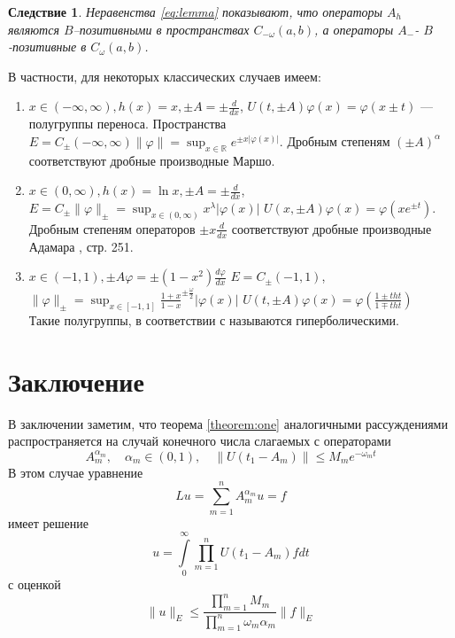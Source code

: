 \documentclass{cmfnre}
\theoremstyle{plain}
\newtheorem{corollary}{Следствие}[lemma]
\numberwithin{equation}{section}
\begin{document}
\begin{corollary}
        Неравенства \eqref{eq:lemma} показывают, что операторы $A_h$ являются $B$--позитивными
        в пространствах $C_{-\omega}(a, b)$, а операторы $A_{-}$- $B$-позитивные в $C_{\omega}(a, b)$.
\end{corollary}

В частности, для некоторых классических случаев имеем:
\begin{enumerate}
    \item $x \in (-\infty, \infty), h(x) = x, \pm A = \pm\frac{d}{dx}$,
    $U(t, \pm A)\varphi(x) = \varphi(x \pm t)$ --- полугруппы переноса.
    Пространства
    $E = C_{\pm}(-\infty, \infty) \|\varphi\| = \sup_{x \in \mathbb{R}} e^{\pm x |\varphi (x)|}$.
    Дробным степеням $(\pm A)^{\alpha}$ соответствуют дробные производные Маршо.
    \item $x \in (0, \infty), h(x) = \ln{x}, \pm A = \pm\frac{d}{dx}$,
    $E = C_{\pm} \|\varphi\|_{\pm} = \sup_{x \in (0, \infty)} x^\lambda |\varphi(x)|$
    $U(x, \pm A)\varphi(x) = \varphi(x e^{\pm t})$.\\
    Дробным степеням операторов $\pm x \frac{d}{dx}$ соответствуют дробные производные Адамара \cite{Samko}, стр. 251.
    \item $x \in (-1, 1), \pm A \varphi = \pm (1-x^2) \frac{d\varphi}{dx}$
    $E = C_{\pm}(-1, 1)$, $\|\varphi\|_{\pm} = \sup_{x \in [-1, 1]} \frac{1+x}{1-x}^{\pm \frac{\omega}{2}} |\varphi(x)|$
    $U(t, \pm A) \varphi(x) = \varphi(\frac{1 \pm tht}{1 \mp tht})$\\
    Такие полугруппы, в соответствии с \cite{Hille} называются гиперболическими.
\end{enumerate}

\section{Заключение}

В заключении заметим, что теорема \ref{theorem:one} аналогичными рассуждениями распространяется
на случай конечного числа слагаемых с операторами
\begin{equation*}
    A_m^{\alpha_m}, \quad \alpha_m\in(0,1), \quad \|U(t_1-A_m)\|\le M_me^{-\omega_mt}
\end{equation*}
В этом случае уравнение
\begin{equation*}
    Lu=\sum\limits_{m=1}^nA_m^{\alpha_m}u=f
\end{equation*}
имеет решение
\begin{equation*}
    u=\int\limits_0^\infty\prod\limits_{m=1}^nU(t_1-A_m)fdt
\end{equation*}
с оценкой
\begin{equation*}
    \|u\|_E\le\frac{\prod_{m=1}^nM_m}{\prod_{m=1}^n\omega_m\alpha_m}\|f\|_E
\end{equation*}
\end{document}
